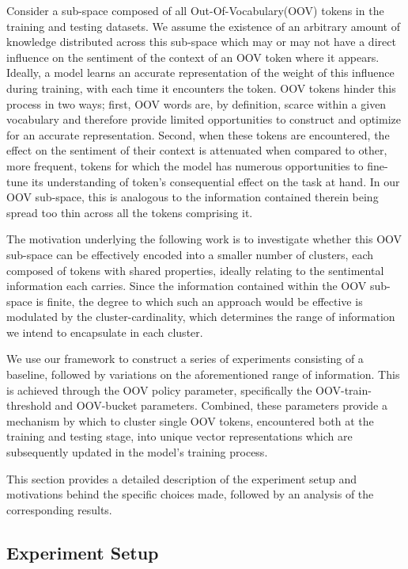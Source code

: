 \documentclass[../../fyp.tex]{subfiles}
\begin{document}
Consider a sub-space composed of all Out-Of-Vocabulary(OOV) tokens in the training and testing datasets. We assume the existence of an arbitrary amount of knowledge distributed across this sub-space which may or may not have a direct influence on the sentiment of the context of an OOV token where it appears. Ideally, a model learns an accurate representation of the weight of this influence during training, with each time it encounters the token. OOV tokens hinder this process in two ways; first, OOV words are, by definition, scarce within a given vocabulary and therefore provide limited opportunities to construct and optimize for an accurate representation. Second, when these tokens are encountered, the effect on the sentiment of their context is attenuated when compared to other, more frequent, tokens for which the model has numerous opportunities to fine-tune its understanding of token's consequential effect on the task at hand. In our OOV sub-space, this is analogous to the information contained therein being spread too thin across all the tokens comprising it. 

The motivation underlying the following work is to investigate whether this OOV sub-space can be effectively encoded into a smaller number of clusters, each composed of tokens with shared properties, ideally relating to the sentimental information each carries. Since the information contained within the OOV sub-space is finite, the degree to which such an approach would be effective is modulated by the cluster-cardinality, which determines the range of information we intend to encapsulate in each cluster.

We use our framework to construct a series of experiments consisting of a baseline, followed by variations on the aforementioned range of information. This is achieved through the OOV policy parameter, specifically the OOV-train-threshold and OOV-bucket parameters. Combined, these parameters provide a mechanism by which to cluster single OOV tokens, encountered both at the training and testing stage, into unique vector representations which are subsequently updated in the model's training process. 

This section provides a detailed description of the experiment setup and motivations behind the specific choices made, followed by an analysis of the corresponding results.

\subsection{Experiment Setup}
\end{document}
